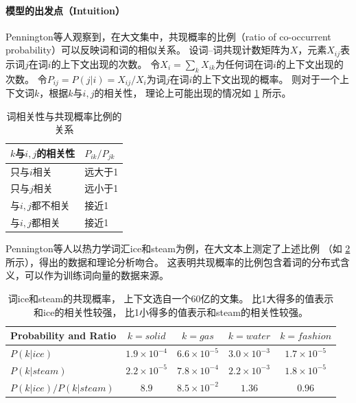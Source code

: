 \paragraph{模型的出发点（Intuition）}
Pennington等人观察到，在大文集中，共现概率的比例（ratio of co-occurrent probability）可以反映词和词的相似关系。
设词--词共现计数矩阵为$X$，元素$X_{ij}$表示词$j$在词$i$的上下文出现的次数。
令$X_i = \sum_k X_{ik}$为任何词在词$i$的上下文出现的次数。
令$P_{ij} = P(j|i) = X_{ij}/X_i$为词$j$在词$i$的上下文出现的概率。
则对于一个上下文词$k$，根据$k$与$i,j$的相关性，
理论上可能出现的情况如 \cref{tab:glove-similarity-ratio} 所示。

\begin{table}
  \setlength{\columnsep}{8pt}
  \renewcommand{\arraystretch}{1.5}
  \centering
  \caption{词相关性与共现概率比例的关系}
  \label{tab:glove-similarity-ratio}
  \begin{tabular}{@{\quad}l@{\quad}l@{\quad}}
    \toprule
    $k$与$i,j$的相关性 & $P_{ik}/P_{jk}$ \\
    \midrule
    只与$i$相关 & 远大于1  \\
    只与$j$相关 & 远小于1  \\
    与$i,j$都不相关 & 接近1  \\
    与$i,j$都相关 & 接近1  \\
    \bottomrule
  \end{tabular}
\end{table}

Pennington等人以热力学词汇ice和steam为例，在大文本上测定了上述比例
（如 \cref{tab:glove-corpus-ratio} 所示），得出的数据和理论分析吻合。
这表明共现概率的比例包含着词的分布式含义，可以作为训练词向量的数据来源。

\begin{table}
  \setlength{\tabcolsep}{8pt}
  \renewcommand{\arraystretch}{1.5}
  \centering
  \caption{词ice和steam的共现概率，
    上下文选自一个60亿的文集。
    比1大得多的值表示和ice的相关性较强，
    比1小得多的值表示和steam的相关性较强。
  \cite{pennington2014glove}}
  \label{tab:glove-corpus-ratio}
  \begin{tabular}{l|cccc}
    Probability and Ratio & $ k = solid $ & $ k = gas $ & $ k = water $ & $ k = fashion$ \\ \hline
    $ P(k |ice)$ &$ 1.9 \times 10^{-4} $&$ 6.6 \times 10^{-5} $&$ 3.0 \times 10^{-3} $&$ 1.7 \times 10^{-5}$\\
    $ P(k |steam)$ &$ 2.2 \times 10^{-5} $&$ 7.8 \times 10^{-4} $&$ 2.2 \times 10^{-3} $&$ 1.8 \times 10^{-5}$\\
    $ P(k |ice)/P(k |steam)$ &$ 8.9 $&$ 8.5 \times 10^{-2} $&$ 1.36 $&$ 0.96$\\
  \end{tabular}
\end{table}

